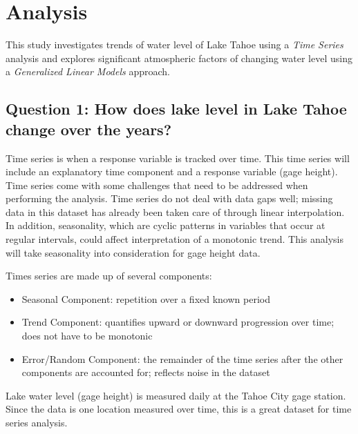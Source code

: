 \documentclass[12pt,]{article}
\providecommand{\tightlist}{%
  \setlength{\itemsep}{0pt}\setlength{\parskip}{0pt}}
\begin{document}
\newpage

\hypertarget{analysis}{%
\section{Analysis}\label{analysis}}

This study investigates trends of water level of Lake Tahoe using a
\emph{Time Series} analysis and explores significant atmospheric factors
of changing water level using a \emph{Generalized Linear Models}
approach.

\hypertarget{question-1-how-does-lake-level-in-lake-tahoe-change-over-the-years}{%
\subsection{Question 1: How does lake level in Lake Tahoe change over
the
years?}\label{question-1-how-does-lake-level-in-lake-tahoe-change-over-the-years}}

Time series is when a response variable is tracked over time. This time
series will include an explanatory time component and a response
variable (gage height). Time series come with some challenges that need
to be addressed when performing the analysis. Time series do not deal
with data gaps well; missing data in this dataset has already been taken
care of through linear interpolation. In addition, seasonality, which
are cyclic patterns in variables that occur at regular intervals, could
affect interpretation of a monotonic trend. This analysis will take
seasonality into consideration for gage height data.

Times series are made up of several components:

\begin{itemize}
\tightlist
\item
  Seasonal Component: repetition over a fixed known period
\item
  Trend Component: quantifies upward or downward progression over time;
  does not have to be monotonic
\item
  Error/Random Component: the remainder of the time series after the
  other components are accounted for; reflects noise in the dataset
\end{itemize}

Lake water level (gage height) is measured daily at the Tahoe City gage
station. Since the data is one location measured over time, this is a
great dataset for time series analysis.
\end{document}
